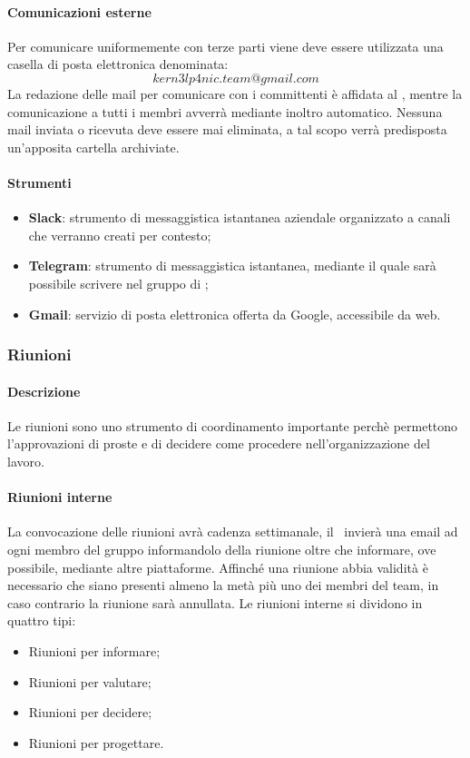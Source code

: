 \documentclass[../NormeDiProgetto_v3.0.0.tex]{subfiles}
\begin{document}
			\paragraph{Comunicazioni esterne}
				Per comunicare uniformemente con terze parti viene deve essere utilizzata una casella di posta elettronica denominata:\\
				\begin{equation*}
				kern3lp4nic.team@gmail.com
				\end{equation*}
				La redazione delle mail per comunicare con i committenti è affidata al \responsabilediprogetto, mentre la comunicazione a tutti i membri avverrà mediante inoltro automatico.
				Nessuna mail inviata o ricevuta deve essere mai eliminata, a tal scopo verrà predisposta un'apposita cartella archiviate.
			\paragraph{Strumenti}
				\begin{itemize}
					\item \textbf{Slack}: strumento di messaggistica istantanea aziendale organizzato a canali che verranno creati per contesto;
					\item \textbf{Telegram}: strumento di messaggistica istantanea, mediante il quale sarà possibile scrivere nel gruppo di \kpanic;
					\item \textbf{Gmail}: servizio di posta elettronica offerta da Google, accessibile da web.
				\end{itemize}
		
		\subsubsection{Riunioni}
			\paragraph{Descrizione}
				Le riunioni sono uno strumento di coordinamento importante perchè permettono l'approvazioni di proste e di decidere come procedere nell'organizzazione del lavoro. 
			\paragraph{Riunioni interne}
				La convocazione delle riunioni avrà cadenza settimanale, il \responsabilediprogetto\ invierà una email ad ogni membro del gruppo informandolo della riunione oltre che informare, ove possibile, mediante altre piattaforme.
				Affinché una riunione abbia validità è necessario che siano presenti almeno la metà più uno dei membri del team, in caso contrario la riunione sarà annullata.
				Le riunioni interne si dividono in quattro tipi:
				\begin{itemize}
					\item Riunioni per informare;
					\item Riunioni per valutare;
					\item Riunioni per decidere;
					\item Riunioni per progettare.
				\end{itemize}
\end{document}
